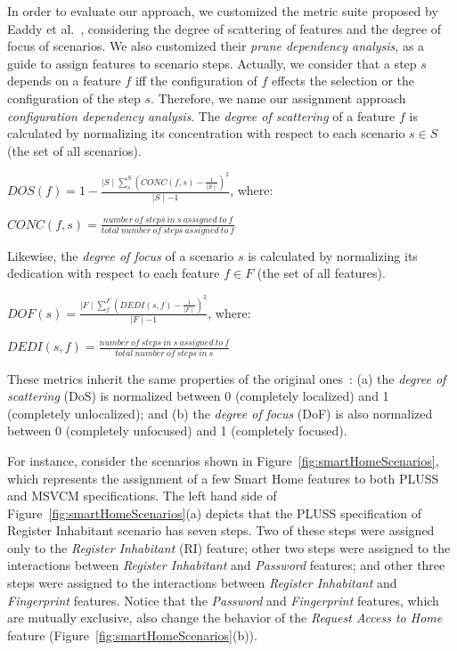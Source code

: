 In order to evaluate our approach, we customized the metric suite proposed by Eaddy et al.~\cite{Eaddy:2007aa},
considering the degree of scattering of features and the degree of focus of scenarios. We also customized their \emph{prune dependency analysis}, as a guide to
assign features to scenario steps. Actually, we consider that a step $s$ depends on a feature $f$ iff the configuration of $f$ effects the selection or the configuration of the step $s$. Therefore, we name our assignment approach
\emph{configuration dependency analysis}.  The \emph{degree of scattering} of a
feature $f$ is calculated by normalizing its concentration with respect to each
scenario $s \in S$ (the set of all scenarios).



%

\begin{center}
$DOS(f) = 1 - \frac{\mid S \mid \sum_{s}^{S}(CONC(f,s)-\frac{1}{\mid S
\mid})^2}{\mid S \mid -1}$, where:

$CONC(f,s) = \frac{number\ of\ steps\ in\ s\ assigned\ to\ f}{total\ number\
of\ steps\ assigned\ to\ f}$
\end{center}

Likewise, the \emph{degree of focus} of a scenario $s$ is calculated by
normalizing its dedication with respect to each feature $f \in F$ (the set of
all features).

\begin{center}
$DOF(s) = \frac{\mid F \mid \sum_{f}^{F}(DEDI(s,f)-\frac{1}{\mid F
\mid})^2}{\mid F \mid -1}$, where:

$DEDI(s,f) = \frac{number\ of\ steps\ in\ s\ assigned\ to\ f}{total\ number\
of\ steps\ in\ s}$
\end{center}

These metrics inherit the same properties of the original
ones~\cite{Eaddy:2007aa}: (a) the
\emph{degree of scattering} (DoS) is normalized between 0 (completely localized)
and 1 (completely unlocalized); and (b) the \emph{degree of focus} (DoF) is also
normalized between 0 (completely unfocused) and 1 (completely focused).


For instance, consider the scenarios shown in
Figure~\ref{fig:smartHomeScenarios}, which represents the assignment of a few Smart Home features to 
both PLUSS and MSVCM specifications. The left hand side of
Figure~\ref{fig:smartHomeScenarios}(a) depicts that the PLUSS specification of
Register Inhabitant scenario has seven steps. Two of these steps were assigned only to the \emph{Register Inhabitant} (RI) feature; other two steps
were assigned to the interactions between \emph{Register Inhabitant} and
\emph{Password} features; and other three steps were assigned to the
interactions between \emph{Register Inhabitant} and \emph{Fingerprint}
features. Notice that the \emph{Password} and \emph{Fingerprint} features, which
are mutually exclusive, also change the behavior of the \emph{Request Access to
Home} feature (Figure~\ref{fig:smartHomeScenarios}(b)).


